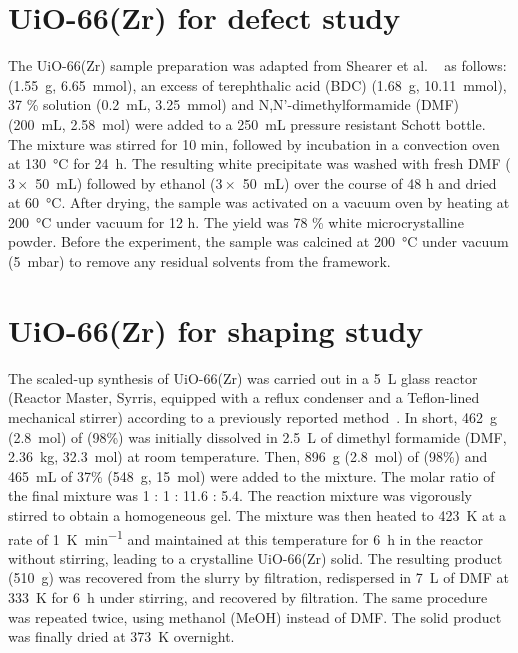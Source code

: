 \section{UiO-66(Zr) for defect study}%
\label{appx:synthesis:uio66def}

The UiO-66(Zr) sample preparation was adapted from Shearer et al.
~\cite{shearerTunedPerfectionIroning2014} as follows:
 (\SI{1.55}{\gram}, \SI{6.65}{\milli\mol}), an excess 
of terephthalic acid (BDC)
(\SI{1.68}{\gram}, \SI{10.11}{\milli\mol}),  37 \% solution 
(\SI{0.2}{\milli\liter}, \SI{3.25}{\milli\mol}) and N,N’-dimethylformamide
(DMF) (\SI{200}{\milli\liter}, \SI{2.58}{\mol}) were added to a 
\SI{250}{\milli\liter} pressure resistant Schott bottle. The mixture 
was stirred for 10 min, followed by incubation in a convection oven 
at \SI{130}{\celsius} for \SI{24}{\hour}. The resulting white 
precipitate was washed with fresh DMF (\(3 \times \) \SI{50}{\milli\liter}) 
followed by ethanol (\(3 \times \) \SI{50}{\milli\liter})
over the course of 48 h and dried at \SI{60}{\celsius}. 
After drying, the sample was activated 
on a vacuum oven by heating at \SI{200}{\celsius} under vacuum for 12 h. 
The yield was 78 \% white microcrystalline powder. Before the 
experiment, the sample was calcined at \SI{200}{\celsius} under
vacuum (\SI{5}{\milli\bar}) to remove any residual solvents
from the framework.

\section{UiO-66(Zr) for shaping study}%
\label{appx:synthesis:uio66shaping}

The scaled-up synthesis of UiO-66(Zr) was carried out in 
a \SI{5}{\liter} glass reactor (Reactor Master, Syrris, equipped with 
a reflux condenser and a Teflon-lined mechanical stirrer)
according to a previously reported 
method~\cite{ragonSituEnergyDispersiveXray2014}.
In short, \SI{462}{\gram} (\SI{2.8}{\mol}) of  (98\%) was 
initially dissolved in \SI{2.5}{\liter} of dimethyl formamide (DMF, 
\SI{2.36}{\kilo\gram}, \SI{32.3}{\mol}) at room temperature. 
Then, \SI{896}{\gram} (\SI{2.8}{\mol}) of 
(98\%) and \SI{465}{\milli\liter} of 37\%  
(\SI{548}{\gram}, \SI{15}{\mol}) were added to the mixture. 
The molar ratio of the final  
mixture was 1 : 1 : 11.6 : 5.4. The reaction mixture was vigorously
stirred to obtain a homogeneous gel. The mixture was then heated
to \SI{423}{\kelvin} at a rate of \SI{1}{\kelvin\per\minute}
and maintained at this temperature for \SI{6}{\hour} in the
reactor without stirring, leading to a crystalline UiO-66(Zr) solid.
The resulting product (\SI{510}{\gram}) was recovered from the 
slurry by filtration, redispersed in \SI{7}{\liter} of DMF at 
\SI{333}{\kelvin} for \SI{6}{\hour} under stirring, 
and recovered by filtration. 
The same procedure was repeated twice, using methanol (MeOH) 
instead of DMF. The solid product was finally dried at 
\SI{373}{\kelvin} overnight.

